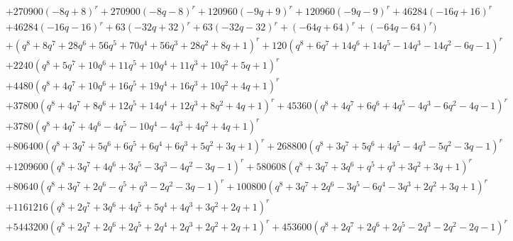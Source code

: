 \documentclass[11pt,english]{amsart}
\numberwithin{equation}{section}
\numberwithin{figure}{section}
\theoremstyle{plain}
\theoremstyle{plain}
\theoremstyle{definition}
\theoremstyle{remark}
\begin{document}
{\begin{align*}
& + 270900  {\left(-8  q + 8\right)}^{r} + 270900  {\left(-8  q - 8\right)}^{r} + 120960  {\left(-9  q + 9\right)}^{r} + 120960  {\left(-9  q - 9\right)}^{r} + 46284  {\left(-16  q + 16\right)}^{r} \\
& + 46284  {\left(-16  q - 16\right)}^{r} + 63  {\left(-32  q + 32\right)}^{r} + 63  {\left(-32  q - 32\right)}^{r} + {\left(-64  q + 64\right)}^{r} + {\left(-64  q - 64\right)}^{r}\Biggr) \\
& + {\left(q^{8} + 8  q^{7} + 28  q^{6} + 56  q^{5} + 70  q^{4} + 56  q^{3} + 28  q^{2} + 8  q + 1\right)}^{r} + 120  {\left(q^{8} + 6  q^{7} + 14  q^{6} + 14  q^{5} - 14  q^{3} - 14  q^{2} - 6  q - 1\right)}^{r} \\
& + 2240  {\left(q^{8} + 5  q^{7} + 10  q^{6} + 11  q^{5} + 10  q^{4} + 11  q^{3} + 10  q^{2} + 5  q + 1\right)}^{r} \\
& + 4480  {\left(q^{8} + 4  q^{7} + 10  q^{6} + 16  q^{5} + 19  q^{4} + 16  q^{3} + 10  q^{2} + 4  q + 1\right)}^{r} \\
& + 37800  {\left(q^{8} + 4  q^{7} + 8  q^{6} + 12  q^{5} + 14  q^{4} + 12  q^{3} + 8  q^{2} + 4  q + 1\right)}^{r} + 45360  {\left(q^{8} + 4  q^{7} + 6  q^{6} + 4  q^{5} - 4  q^{3} - 6  q^{2} - 4  q - 1\right)}^{r} \\
& + 3780  {\left(q^{8} + 4  q^{7} + 4  q^{6} - 4  q^{5} - 10  q^{4} - 4  q^{3} + 4  q^{2} + 4  q + 1\right)}^{r} \\
& + 806400  {\left(q^{8} + 3  q^{7} + 5  q^{6} + 6  q^{5} + 6  q^{4} + 6  q^{3} + 5  q^{2} + 3  q + 1\right)}^{r} + 268800  {\left(q^{8} + 3  q^{7} + 5  q^{6} + 4  q^{5} - 4  q^{3} - 5  q^{2} - 3  q - 1\right)}^{r} \\
& + 1209600  {\left(q^{8} + 3  q^{7} + 4  q^{6} + 3  q^{5} - 3  q^{3} - 4  q^{2} - 3  q - 1\right)}^{r} + 580608  {\left(q^{8} + 3  q^{7} + 3  q^{6} + q^{5} + q^{3} + 3  q^{2} + 3  q + 1\right)}^{r} \\
& + 80640  {\left(q^{8} + 3  q^{7} + 2  q^{6} - q^{5} + q^{3} - 2  q^{2} - 3  q - 1\right)}^{r} + 100800  {\left(q^{8} + 3  q^{7} + 2  q^{6} - 3  q^{5} - 6  q^{4} - 3  q^{3} + 2  q^{2} + 3  q + 1\right)}^{r} \\
& + 1161216  {\left(q^{8} + 2  q^{7} + 3  q^{6} + 4  q^{5} + 5  q^{4} + 4  q^{3} + 3  q^{2} + 2  q + 1\right)}^{r} \\
& + 5443200  {\left(q^{8} + 2  q^{7} + 2  q^{6} + 2  q^{5} + 2  q^{4} + 2  q^{3} + 2  q^{2} + 2  q + 1\right)}^{r} + 453600  {\left(q^{8} + 2  q^{7} + 2  q^{6} + 2  q^{5} - 2  q^{3} - 2  q^{2} - 2  q - 1\right)}^{r} \\

\end{align*}}
\end{document}
